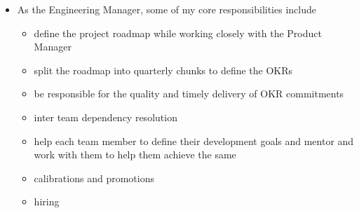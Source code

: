 \documentclass[11pt,a4paper,sans]{moderncv} %
\begin{document}
{\begin{itemize}
            \begin{itemize}
              \item Customer Referrals
              \item Incentivized actions (aka Gamification)
              \item Mystery box
            \end{itemize}
            \item As the Engineering Manager, some of my core responsibilities include
            \begin{itemize}
              \item define the project roadmap while working closely with the Product Manager
              \item split the roadmap into quarterly chunks to define the OKRs
              \item be responsible for the quality and timely delivery of OKR commitments
              \item inter team dependency resolution
              \item help each team member to define their development goals and mentor and work with them to help them achieve the same
              \item calibrations and promotions
              \item hiring
            \end{itemize}
          \end{itemize}}
\end{document}
